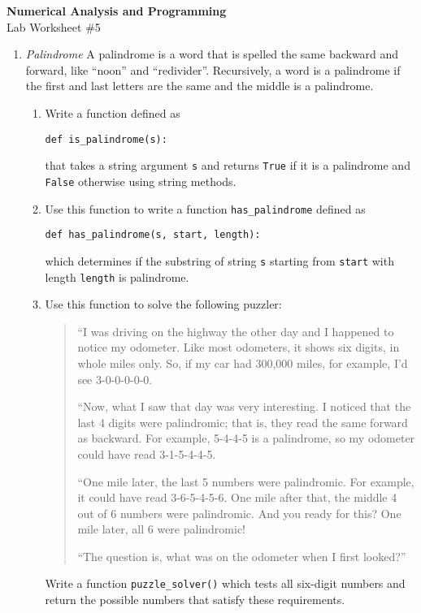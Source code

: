 \documentclass[12pt]{article}
\begin{document}
\begin{center}
\Large
\textbf{Numerical Analysis and Programming}\\
\large
Lab Worksheet \#5
\end{center}
\begin{enumerate}
\item \textit{Palindrome} A palindrome is a word that is spelled the same backward and
forward, like ``noon'' and ``redivider''.  Recursively, a word
is a palindrome if the first and last letters are the same
and the middle is a palindrome. 

\begin{enumerate} 
\item Write a function defined as
\begin{verbatim}
def is_palindrome(s):
\end{verbatim}
 that takes
a string argument \verb!s! and returns {\tt True} if it is a palindrome
and {\tt False} otherwise using string methods.  
\item Use this function to write a function \verb"has_palindrome" defined as 
\begin{verbatim}
def has_palindrome(s, start, length):
\end{verbatim}
which determines if the  substring of string \verb!s! starting from \verb!start! with length \verb!length! is palindrome.  
\item Use this function to solve the following puzzler:
\begin{quote}
``I was driving on the highway the other day and I happened to
notice my odometer. Like most odometers, it shows six digits,
in whole miles only. So, if my car had 300,000
miles, for example, I'd see 3-0-0-0-0-0.

``Now, what I saw that day was very interesting. I noticed that the
last 4 digits were palindromic; that is, they read the same forward as
backward. For example, 5-4-4-5 is a palindrome, so my odometer
could have read 3-1-5-4-4-5.

``One mile later, the last 5 numbers were palindromic. For example, it
could have read 3-6-5-4-5-6.  One mile after that, the middle 4 out of
6 numbers were palindromic.  And you ready for this? One mile later,
all 6 were palindromic!

``The question is, what was on the odometer when I first looked?''
\end{quote}
Write a function \verb!puzzle_solver()! which  tests all six-digit numbers and return the possible numbers that satisfy these requirements.



\end{enumerate}
\end{enumerate}
\end{document}
